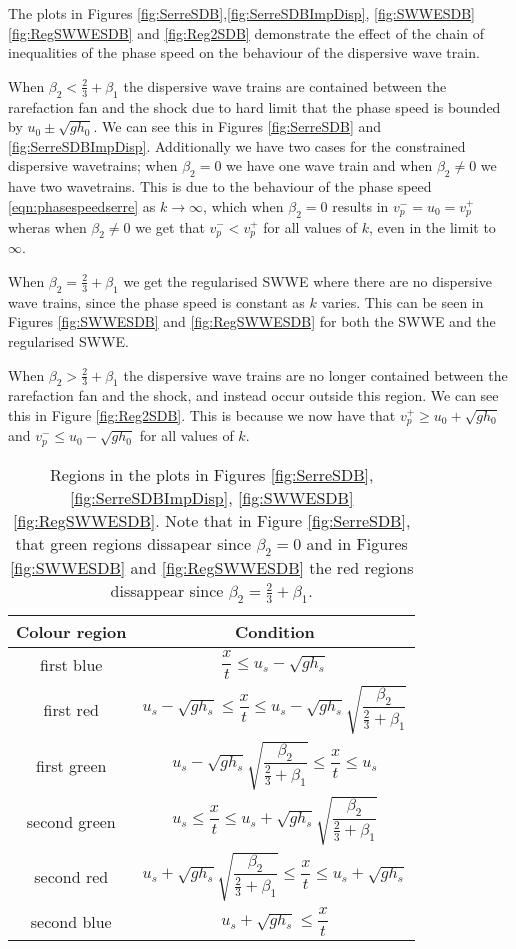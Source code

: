 \documentclass[10pt]{article}
\begin{document}
The plots  in Figures \ref{fig:SerreSDB},\ref{fig:SerreSDBImpDisp}, \ref{fig:SWWESDB} \ref{fig:RegSWWESDB} and \ref{fig:Reg2SDB} demonstrate the effect of the chain of inequalities of the phase speed on the behaviour of the dispersive wave train. 

When $\beta_2 < \frac{2}{3} + \beta_1$ the dispersive wave trains are contained between the rarefaction fan and the shock due to hard limit that the phase speed is bounded by $u_0 \pm \sqrt{gh_0}$. We can see this in Figures  \ref{fig:SerreSDB} and \ref{fig:SerreSDBImpDisp}. Additionally we have two cases for the constrained dispersive wavetrains; when $\beta_2 = 0$ we have one wave train and when $\beta_2 \neq 0$ we have two wavetrains. This is due to the behaviour of the phase speed \eqref{eqn:phasespeedserre} as $k \rightarrow \infty$, which when $\beta_2 = 0$ results in $v^-_p = u_0 = v^+_p$ wheras when $\beta_2 \neq 0$ we get that $v^-_p < v^+_p$ for all values of $k$, even in the limit to $\infty$. 

When $\beta_2 = \frac{2}{3} + \beta_1$ we get the regularised SWWE where there are no dispersive wave trains, since the phase speed is constant as $k$ varies. This can be seen in Figures \ref{fig:SWWESDB} and \ref{fig:RegSWWESDB} for both the SWWE and the regularised SWWE. 

When $\beta_2 > \frac{2}{3} + \beta_1$ the dispersive wave trains are no longer contained between the rarefaction fan and the shock, and instead occur outside this region. We can see this in Figure \ref{fig:Reg2SDB}. This is because we now have that $v_p^+ \ge  u_0 + \sqrt{gh_0}$ and  $v_p^- \le  u_0 - \sqrt{gh_0}$ for all values of $k$. 

\begin{table}
	\centering
	\begin{tabular}{c | c}
		Colour region & Condition \\
		\hline
		first blue & $\dfrac{x}{t} \le u_{s} - \sqrt{g h_{s}} $ \\
		first red & $  u_{s} - \sqrt{g h_{s}} \le \dfrac{x}{t} \le u_s - \sqrt{gh_s} \sqrt{\dfrac{\beta_2}{\frac{2}{3} + \beta_1}}$ \\
		first green & $u_s - \sqrt{gh_s} \sqrt{\dfrac{\beta_2}{\frac{2}{3} + \beta_1}} \le \dfrac{x}{t} \le u_{s}$ \\
		second green & $u_{s} \le \dfrac{x}{t}\le u_s + \sqrt{gh_s} \sqrt{\dfrac{\beta_2}{\frac{2}{3} + \beta_1}}$ \\
		second red & $  u_s + \sqrt{gh_s} \sqrt{\dfrac{\beta_2}{\frac{2}{3} + \beta_1}} \le \dfrac{x}{t} \le  u_{s} + \sqrt{g h_{s}} $ \\
		second blue & $u_{s} +  \sqrt{g h_{s}} \le \dfrac{x}{t} $ 	
	\end{tabular}
	\caption{Regions in the plots in Figures \ref{fig:SerreSDB},\ref{fig:SerreSDBImpDisp}, \ref{fig:SWWESDB} \ref{fig:RegSWWESDB}. Note that in Figure \ref{fig:SerreSDB}, that green regions dissapear since $\beta_2 = 0$ and in Figures \ref{fig:SWWESDB} and \ref{fig:RegSWWESDB} the red regions dissappear since $\beta_2 = \frac{2}{3} + \beta_1$. 	\label{tab:regions1}  }
\end{table}
\end{document}
